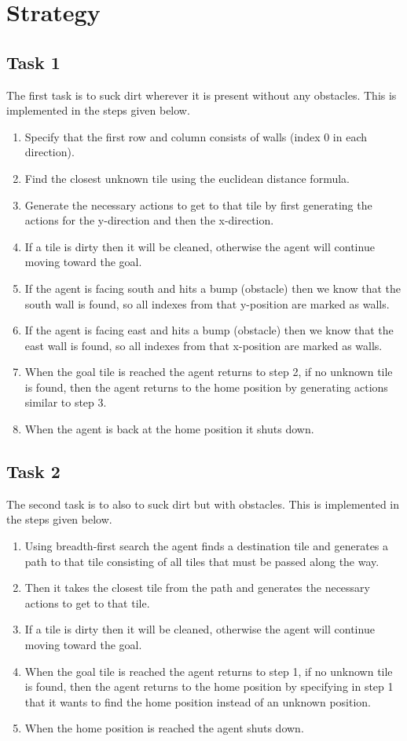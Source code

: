 \documentclass[a4paper,10pt]{article}
\begin{document}
\section{Strategy}
\subsection{Task 1}

The first task is to suck dirt wherever it is present without any obstacles. This is implemented in the steps given below.
\begin{enumerate}
	\item Specify that the first row and column consists of walls (index 0 in each direction).
	\item Find the closest unknown tile using the euclidean distance formula.
	\item Generate the necessary actions to get to that tile by first generating the actions for the y-direction and then the x-direction.
	\item If a tile is dirty then it will be cleaned, otherwise the agent will continue moving toward the goal.
	\item If the agent is facing south and hits a bump (obstacle) then we know that the south wall is found, so all indexes from that y-position are marked as walls.
	\item If the agent is facing east and hits a bump (obstacle) then we know that the east wall is found, so all indexes from that x-position are marked as walls.
	\item When the goal tile is reached the agent returns to step 2, if no unknown tile is found, then the agent returns to the home position by generating actions similar to step 3.
	\item When the agent is back at the home position it shuts down.
\end{enumerate}

\subsection{Task 2}

The second task is to also to suck dirt but with obstacles. This is implemented in the steps given below.
\begin{enumerate}
	\item Using breadth-first search the agent finds a destination tile and generates a path to that tile consisting of all tiles that must be passed along the way.
	\item Then it takes the closest tile from the path and generates the necessary actions to get to that tile.
	\item If a tile is dirty then it will be cleaned, otherwise the agent will continue moving toward the goal.
	\item When the goal tile is reached the agent returns to step 1, if no unknown tile is found, then the agent returns to the home position by specifying in step 1 that it wants to find the home position instead of an unknown position.
	\item When the home position is reached the agent shuts down.
\end{enumerate}
\end{document}
